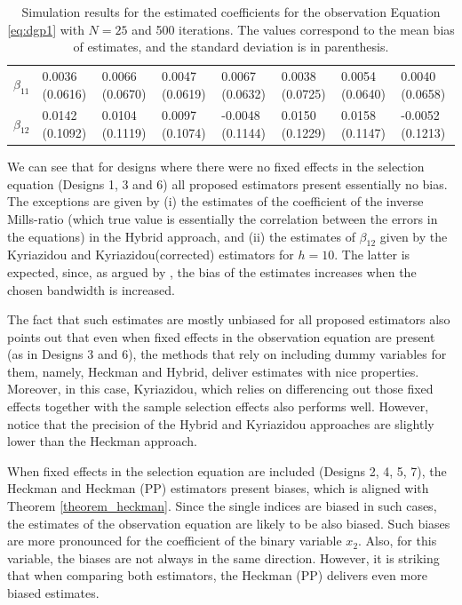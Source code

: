 \begin{table}
\begin{adjustwidth}{-.5in}{-.5in}
\begin{tabular}{p{3cm}p{1.3cm}p{1.3cm}p{1.3cm}p{1.3cm}p{1.3cm}p{1.3cm}p{1.3cm}}
   \hline
    $\beta_{11}$  & 0.0036 (0.0616) & 0.0066 (0.0670) & 0.0047 (0.0619) &  0.0067 (0.0632) & 0.0038 (0.0725) &  0.0054 (0.0640)& 0.0040 (0.0658) \\
    $\beta_{12}$  & 0.0142 (0.1092) & 0.0104 (0.1119) & 0.0097 (0.1074) &  -0.0048 (0.1144) & 0.0150 (0.1229) &  0.0158 (0.1147) & -0.0052 (0.1213)\\
    \hline
\end{tabular}
\caption{\footnotesize{Simulation results for the estimated coefficients for the observation Equation \ref{eq:dgp1} with $N=25$ and 500 iterations. The values correspond to the mean bias of estimates, and the standard deviation is in parenthesis.}}
\label{tab:7}
\end{adjustwidth}
\end{table}

We can see that for designs where there were no fixed effects in the selection equation (Designs 1, 3 and 6) all proposed estimators present essentially no bias. The exceptions are given by (i) the estimates of the coefficient of the inverse Mills-ratio (which true value is essentially the correlation between the errors in the equations) in the Hybrid approach, and (ii) the estimates of $\beta_{12}$ given by the Kyriazidou and Kyriazidou(corrected) estimators for $h=10$. The latter is expected, since, as argued by \cite{kyriazidou1997estimation}, the bias of the estimates increases when the chosen bandwidth is increased.

The fact that such estimates are mostly unbiased for all proposed estimators also points out that even when fixed effects in the observation equation are present (as in Designs 3 and 6), the methods that rely on including dummy variables for them, namely, Heckman and Hybrid, deliver estimates with nice properties. Moreover, in this case, Kyriazidou, which relies on differencing out those fixed effects together with the sample selection effects also performs well. However, notice that the precision of the Hybrid and Kyriazidou approaches are slightly lower than the Heckman approach. 

When fixed effects in the selection equation are included (Designs 2, 4, 5, 7), the Heckman and Heckman (PP) estimators present biases, which is aligned with Theorem \ref{theorem_heckman}. Since the single indices are biased in such cases, the estimates of the observation equation are likely to be also biased. Such biases are more pronounced for the coefficient of the binary variable $x_{2}$. Also, for this variable, the biases are not always in the same direction. However, it is striking that when comparing both estimators, the Heckman (PP) delivers even more biased estimates.

